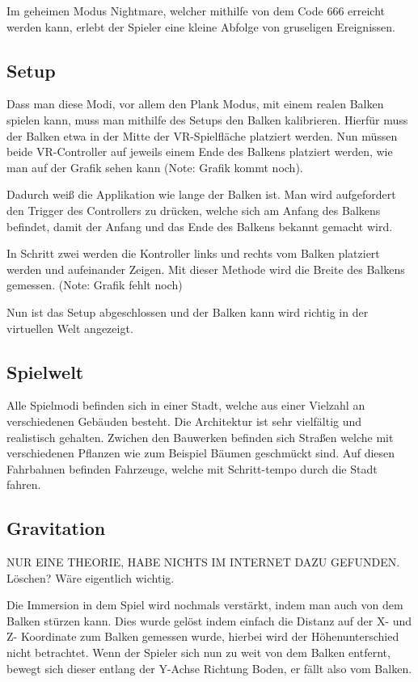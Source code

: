 Im geheimen Modus Nightmare, welcher mithilfe von dem Code 666 erreicht werden kann, erlebt der Spieler eine kleine Abfolge von gruseligen Ereignissen.

\subsection{Setup}
Dass man diese Modi, vor allem den Plank Modus, mit einem realen Balken spielen kann, muss man mithilfe des Setups den Balken kalibrieren.
Hierfür muss der Balken etwa in der Mitte der VR-Spielfläche platziert werden.
Nun müssen beide VR-Controller auf jeweils einem Ende des Balkens platziert werden, wie man auf der Grafik sehen kann (Note: Grafik kommt noch).

Dadurch weiß die Applikation wie lange der Balken ist.
Man wird aufgefordert den Trigger des Controllers zu drücken, welche sich am Anfang des Balkens befindet, damit der Anfang und das Ende des Balkens bekannt gemacht wird.


In Schritt zwei werden die Kontroller links und rechts vom Balken platziert werden und aufeinander Zeigen.
Mit dieser Methode wird die Breite des Balkens gemessen. (Note: Grafik fehlt noch)


Nun ist das Setup abgeschlossen und der Balken kann wird richtig in der virtuellen Welt angezeigt.

\subsection{Spielwelt}
Alle Spielmodi befinden sich in einer Stadt, welche aus einer Vielzahl an verschiedenen Gebäuden besteht.
Die Architektur ist sehr vielfältig und realistisch gehalten.
Zwichen den Bauwerken befinden sich Straßen welche mit verschiedenen Pflanzen wie zum Beispiel Bäumen geschmückt sind.
Auf diesen Fahrbahnen befinden Fahrzeuge, welche mit Schritt-tempo durch die Stadt fahren.

\subsection{Gravitation}
NUR EINE THEORIE, HABE NICHTS IM INTERNET DAZU GEFUNDEN. Löschen? Wäre eigentlich wichtig.

Die Immersion in dem Spiel wird nochmals verstärkt, indem man auch von dem Balken stürzen kann.
Dies wurde gelöst indem einfach die Distanz auf der X- und Z- Koordinate zum Balken gemessen wurde, hierbei wird der Höhenunterschied nicht betrachtet.
Wenn der Spieler sich nun zu weit von dem Balken entfernt, bewegt sich dieser entlang der Y-Achse Richtung Boden, er fällt also vom Balken.

%
%

